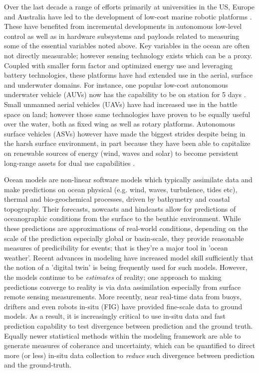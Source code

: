 Over the last decade a range of efforts primarily at universities in
the US, Europe and Australia have led to the development of low-cost
marine robotic platforms \cite{}. These have benefited from
incremental developments in autonomous low-level control \cite{} as
well as in hardware subsystems and payloads related to measuring some
of the essential variables noted above. Key variables in the ocean are
often not directly measurable; however sensing technology exists which
can be a proxy. Coupled with smaller form factor and optimized energy
use and leveraging battery technologies, these platforms have had
extended use in the aerial, surface and underwater domains. For
instance, one popular low-cost autonomous underwater vehicle (AUVs)
now has the capability to be on station for 5 days \cite{}. Small
unmanned aerial vehicles (UAVs) have had increased use in the battle
space on land; however those same technologies have proven to be
equally useful over the water, both as fixed wing as well as rotary
platforms. Autonomous surface vehicles (ASVs) however have made the
biggest strides despite being in the harsh surface environment, in
part because they have been able to capitalize on renewable sources of
energy (wind, waves and solar) to become persistent long-range assets
for dual use capabilities \cite{}. 

Ocean models are non-linear software models which typically assimilate
data and make predictions on ocean physical (e.g. wind, waves,
turbulence, tides etc), thermal and bio-geochemical processes, driven
by bathymetry and coastal topography. Their forecasts, nowcasts and
hindcasts allow for predictions of oceanographic conditions from the
surface to the benthic environment. While these predictions are
approximations of real-world conditions, depending on the scale of the
prediction especially global or basin-scale, they provide reasonable
measures of predicibility for events; that is they're a major tool in
'ocean weather'. Recent advances in modeling have increased model
skill sufficiently that the notion of a 'digital twin' is being
frequently used for such models. However, the models continue to be
\emph{estimates} of reality; one approach to making predictions
converge to reality is via data assimilation especially from surface
remote sensing measurements. More recently, near real-time data from
buoys, drifters and even robots in-situ (FIG) have provided fine-scale
data to ground models. As a result, it is increasingly critical to use
in-situ data and fast prediction capability to test divergence between
prediction and the ground truth. Equally newer statistical methods
\cite{} within the modeling framework are able to generate measures of
coherance and uncertainty, which can be quantified to direct more (or
less) in-situ data collection to \emph{reduce} such divergence between
prediction and the ground-truth. 

